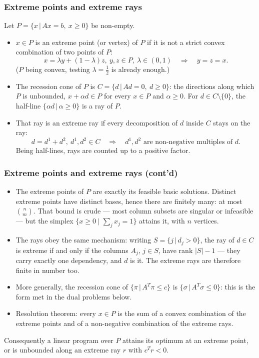 \documentclass[aspectratio=169]{beamer}
\providecommand{\red}{\color{red}}
\begin{document}
\begin{frame}
\frametitle{Extreme points and extreme rays}

Let $P = \lbrace x \,|\, Ax = b,\ x \geq 0 \rbrace$ be non-empty.
\begin{itemize}
	\item
	$x \in P$ is an {\red extreme point} (or vertex) of $P$ if it is not a strict convex combination of two points of $P$:
	\[
	x = \lambda y + (1-\lambda)z,\ y, z \in P,\ \lambda \in (0,1) \quad \Longrightarrow \quad y = z = x.
	\]
	($P$ being convex, testing $\lambda = \tfrac12$ is already enough.)
	\item
	The {\red recession cone} of $P$ is $C = \lbrace d \,|\, Ad = 0,\ d \geq 0 \rbrace$: the directions along which $P$ is unbounded, $x + \alpha d \in P$ for every $x \in P$ and $\alpha \geq 0$.
	For $d \in C \setminus \lbrace 0 \rbrace$, the half-line $\lbrace \alpha d \,|\, \alpha \geq 0 \rbrace$ is a {\red ray} of $P$.
	\item
	That ray is an {\red extreme ray} if every decomposition of $d$ inside $C$ stays on the ray:
	\[
	d = d^1 + d^2,\ d^1, d^2 \in C \quad \Longrightarrow \quad d^1, d^2 \text{ are non-negative multiples of } d.
	\]
	Being half-lines, rays are counted {\red up to a positive factor}.
\end{itemize}

\end{frame}

\begin{frame}
\frametitle{Extreme points and extreme rays (cont'd)}

\begin{itemize}
	\item
	The extreme points of $P$ are exactly its feasible basic solutions. Distinct extreme points have distinct bases, hence there are {\red finitely many}: at most $\binom{n}{m}$. That bound is crude --- most column subsets are singular or infeasible --- but the simplex $\lbrace x \geq 0 \mid \sum_j x_j = 1 \rbrace$ attains it, with $n$ vertices.
	\item
	The rays obey the same mechanism: writing $S = \lbrace j \,|\, d_j > 0 \rbrace$, the ray of $d \in C$ is extreme if and only if the columns $A_j$, $j \in S$, have rank $|S|-1$ --- they carry exactly one dependency, and $d$ is it.
	The extreme rays are therefore {\red finite} in number too.
	\item
	More generally, the recession cone of $\lbrace \pi \,|\, A^T\pi \leq c \rbrace$ is $\lbrace \sigma \,|\, A^T\sigma \leq 0 \rbrace$: this is the form met in the dual problems below.
	\item
	{\red Resolution theorem}: every $x \in P$ is the sum of a convex combination of the extreme points and of a non-negative combination of the extreme rays.
\end{itemize}

Consequently a linear program over $P$ attains its optimum at an extreme point, or is unbounded along an extreme ray $r$ with $c^Tr < 0$.

\end{frame}
\end{document}

